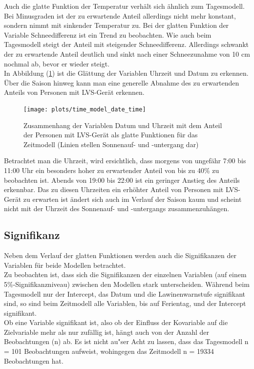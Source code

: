\documentclass[12pt]{scrreprt}
\begin{document}
Auch die glatte Funktion der Temperatur verhält sich ähnlich zum Tagesmodell. Bei Minusgraden ist der zu erwartende Anteil allerdings nicht mehr konstant, sondern nimmt mit sinkender Temperatur zu. Bei der glatten Funktion der Variable Schneedifferenz ist ein Trend zu beobachten. Wie auch beim Tagesmodell steigt der Anteil mit steigender Schneedifferenz. Allerdings schwankt der zu erwartende Anteil deutlich und sinkt nach einer Schneezunahme von 10 cm nochmal ab, bevor er wieder steigt. \\
In Abbildung (\ref{pic:time_model_date_time}) ist die Glättung der Variablen Uhrzeit und Datum zu erkennen. Über die Saison hinweg kann man eine generelle Abnahme des zu erwartenden Anteils von Personen mit LVS-Gerät erkennen.
\begin{figure}[H]
	\centering
	\texttt{[image: plots/time\_model\_date\_time]}
	\caption{Zusammenhang der Variablen Datum und Uhrzeit mit dem Anteil der Personen mit LVS-Gerät als glatte Funktionen für das Zeitmodell (Linien stellen Sonnenauf- und -untergang dar)}
	\label{pic:time_model_date_time}	
\end{figure}
\noindent Betrachtet man die Uhrzeit, wird ersichtlich, dass morgens von ungefähr 7:00 bis 11:00 Uhr ein besonders hoher zu erwartender Anteil von bis zu 40\% zu beobachten ist. Abends von 19:00 bis 22:00 ist ein geringer Anstieg des Anteils erkennbar. Das zu diesen Uhrzeiten ein erhöhter Anteil von Personen mit LVS-Gerät zu erwarten ist ändert sich auch im Verlauf der Saison kaum und scheint nicht mit der Uhrzeit des Sonnenauf- und -untergangs zusammenzuhängen.

\subsection{Signifikanz}
Neben dem Verlauf der glatten Funktionen werden auch die Signifikanzen der Variablen für beide Modellen betrachtet. \\
Zu beobachten ist, dass sich die Signifikanzen der einzelnen Variablen (auf einem 5\%-Signifikanzniveau) zwischen den Modellen stark unterscheiden. Während beim Tagesmodell nur der Intercept, das Datum und die Lawinenwarnstufe signifikant sind, so sind beim Zeitmodell alle Variablen, bis auf Ferientag, und der Intercept signifikant. \\
Ob eine Variable signifikant ist, also ob der Einfluss der Kovariable auf die Zielvariable mehr als nur zufällig ist, hängt auch von der Anzahl der Beobachtungen (n) ab. Es ist nicht au"ser Acht zu lassen, dass das Tagesmodell n = 101 Beobachtungen aufweist, wohingegen das Zeitmodell n = 19334 Beobachtungen hat.
\end{document}
